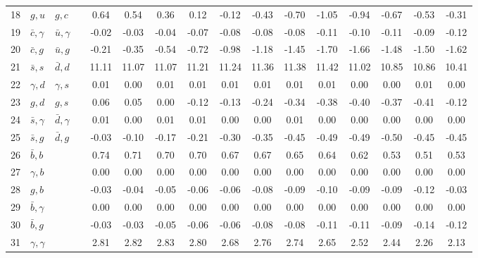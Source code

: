 \begin{tabularx}{\textwidth}{rXXX@{}S@{}S@{}S@{}S@{}S@{}S@{}S@{}S@{}S@{}S@{}S@{}S}
 18 & $g,u$            & $g,c$            &                 &  0.64 &  0.54 &  0.36 &  0.12 & -0.12 & -0.43 & -0.70 & -1.05 & -0.94 & -0.67 & -0.53 & -0.31 \\
 19 & $\bar c,\gamma$  & $\bar u,\gamma$  &                 & -0.02 & -0.03 & -0.04 & -0.07 & -0.08 & -0.08 & -0.08 & -0.11 & -0.10 & -0.11 & -0.09 & -0.12 \\
 20 & $\bar c, g$      & $\bar u, g$      &                 & -0.21 & -0.35 & -0.54 & -0.72 & -0.98 & -1.18 & -1.45 & -1.70 & -1.66 & -1.48 & -1.50 & -1.62 \\
 21 & $\bar s, s$      & $\bar d, d$      &                 & 11.11 & 11.07 & 11.07 & 11.21 & 11.24 & 11.36 & 11.38 & 11.42 & 11.02 & 10.85 & 10.86 & 10.41 \\
 22 & $\gamma, d$      & $\gamma, s$      &                 &  0.01 &  0.00 &  0.01 &  0.01 &  0.01 &  0.01 &  0.01 &  0.01 &  0.00 &  0.00 &  0.01 &  0.00 \\
 23 & $g,d$            & $g,s$            &                 &  0.06 &  0.05 &  0.00 & -0.12 & -0.13 & -0.24 & -0.34 & -0.38 & -0.40 & -0.37 & -0.41 & -0.12 \\
 24 & $\bar s,\gamma$  & $\bar d,\gamma$  &                 &  0.01 &  0.00 &  0.01 &  0.01 &  0.00 &  0.00 &  0.01 &  0.00 &  0.00 &  0.00 &  0.00 &  0.00 \\
 25 & $\bar s,g$       & $\bar d, g$      &                 & -0.03 & -0.10 & -0.17 & -0.21 & -0.30 & -0.35 & -0.45 & -0.49 & -0.49 & -0.50 & -0.45 & -0.45 \\
 26 & $\bar b,b$       &                  &                 &  0.74 &  0.71 &  0.70 &  0.70 &  0.67 &  0.67 &  0.65 &  0.64 &  0.62 &  0.53 &  0.51 &  0.53 \\
 27 & $\gamma, b$      &                  &                 &  0.00 &  0.00 &  0.00 &  0.00 &  0.00 &  0.00 &  0.00 &  0.00 &  0.00 &  0.00 &  0.00 &  0.00 \\
 28 & $g,b$            &                  &                 & -0.03 & -0.04 & -0.05 & -0.06 & -0.06 & -0.08 & -0.09 & -0.10 & -0.09 & -0.09 & -0.12 & -0.03 \\
 29 & $\bar b,\gamma$  &                  &                 &  0.00 &  0.00 &  0.00 &  0.00 &  0.00 &  0.00 &  0.00 &  0.00 &  0.00 &  0.00 &  0.00 &  0.00 \\
 30 & $\bar b,g$       &                  &                 & -0.03 & -0.03 & -0.05 & -0.06 & -0.06 & -0.08 & -0.08 & -0.11 & -0.11 & -0.09 & -0.14 & -0.12 \\
 31 & $\gamma,\gamma$  &                  &                 &  2.81 &  2.82 &  2.83 &  2.80 &  2.68 &  2.76 &  2.74 &  2.65 &  2.52 &  2.44 &  2.26 &  2.13 \\

\end{tabularx}
